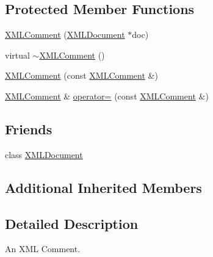 \subsection*{Protected Member Functions}
\begin{DoxyCompactItemize}
\item 
\hyperlink{classtinyxml2_1_1_x_m_l_comment_ae6463adc3edd93a8e5a9b2b7e99cdf91}{X\-M\-L\-Comment} (\hyperlink{classtinyxml2_1_1_x_m_l_document}{X\-M\-L\-Document} $\ast$doc)
\item 
virtual \hyperlink{classtinyxml2_1_1_x_m_l_comment_ab592f69b47852455c1b32c5e31e453d0}{$\sim$\-X\-M\-L\-Comment} ()
\item 
\hyperlink{classtinyxml2_1_1_x_m_l_comment_aa0a9aae0850ac0e70d3cd20f6cb44447}{X\-M\-L\-Comment} (const \hyperlink{classtinyxml2_1_1_x_m_l_comment}{X\-M\-L\-Comment} \&)
\item 
\hyperlink{classtinyxml2_1_1_x_m_l_comment}{X\-M\-L\-Comment} \& \hyperlink{classtinyxml2_1_1_x_m_l_comment_ac8de55f8381d110740772e6bf6f5755a}{operator=} (const \hyperlink{classtinyxml2_1_1_x_m_l_comment}{X\-M\-L\-Comment} \&)
\end{DoxyCompactItemize}
\subsection*{Friends}
\begin{DoxyCompactItemize}
\item 
class \hyperlink{classtinyxml2_1_1_x_m_l_comment_a4eee3bda60c60a30e4e8cd4ea91c4c6e}{X\-M\-L\-Document}
\end{DoxyCompactItemize}
\subsection*{Additional Inherited Members}


\subsection{Detailed Description}
An X\-M\-L Comment. 


